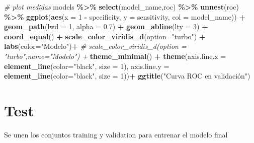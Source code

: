 \documentclass[12pt,a4paper,]{book}
\newenvironment{Shaded}{\begin{snugshade}}{\end{snugshade}}
\newcommand{\AttributeTok}[1]{\textcolor[rgb]{0.13,0.29,0.53}{#1}}
\newcommand{\CommentTok}[1]{\textcolor[rgb]{0.56,0.35,0.01}{\textit{#1}}}
\newcommand{\DecValTok}[1]{\textcolor[rgb]{0.00,0.00,0.81}{#1}}
\newcommand{\FloatTok}[1]{\textcolor[rgb]{0.00,0.00,0.81}{#1}}
\newcommand{\FunctionTok}[1]{\textcolor[rgb]{0.13,0.29,0.53}{\textbf{#1}}}
\newcommand{\NormalTok}[1]{#1}
\newcommand{\SpecialCharTok}[1]{\textcolor[rgb]{0.81,0.36,0.00}{\textbf{#1}}}
\newcommand{\StringTok}[1]{\textcolor[rgb]{0.31,0.60,0.02}{#1}}
\numberwithin{dummy}{section}
\theoremstyle{ocrenumbox}
\theoremstyle{blacknumex}
\theoremstyle{blacknumbox}
\theoremstyle{ocrenum}
\theoremstyle{ocrenum}
\begin{document}
\begin{Shaded}
\begin{Highlighting}[]
\CommentTok{\# plot medidas}
\NormalTok{models }\SpecialCharTok{\%\textgreater{}\%} \FunctionTok{select}\NormalTok{(model\_name,roc) }\SpecialCharTok{\%\textgreater{}\%} \FunctionTok{unnest}\NormalTok{(roc) }\SpecialCharTok{\%\textgreater{}\%} 
  \FunctionTok{ggplot}\NormalTok{(}\FunctionTok{aes}\NormalTok{(}\AttributeTok{x =} \DecValTok{1} \SpecialCharTok{{-}}\NormalTok{ specificity, }\AttributeTok{y =}\NormalTok{ sensitivity, }\AttributeTok{col =}\NormalTok{ model\_name)) }\SpecialCharTok{+} 
  \FunctionTok{geom\_path}\NormalTok{(}\AttributeTok{lwd =} \DecValTok{1}\NormalTok{, }\AttributeTok{alpha =} \FloatTok{0.7}\NormalTok{) }\SpecialCharTok{+}
  \FunctionTok{geom\_abline}\NormalTok{(}\AttributeTok{lty =} \DecValTok{3}\NormalTok{) }\SpecialCharTok{+} 
  \FunctionTok{coord\_equal}\NormalTok{() }\SpecialCharTok{+} 
  \FunctionTok{scale\_color\_viridis\_d}\NormalTok{(}\AttributeTok{option=}\StringTok{"turbo"}\NormalTok{) }\SpecialCharTok{+}
  \FunctionTok{labs}\NormalTok{(}\AttributeTok{color=}\StringTok{"Modelo"}\NormalTok{)}\SpecialCharTok{+}
  \CommentTok{\# scale\_color\_viridis\_d(option = "turbo",name="Modelo") +}
  \FunctionTok{theme\_minimal}\NormalTok{() }\SpecialCharTok{+} 
  \FunctionTok{theme}\NormalTok{(}\AttributeTok{axis.line.x =} \FunctionTok{element\_line}\NormalTok{(}\AttributeTok{color=}\StringTok{"black"}\NormalTok{, }\AttributeTok{size =} \DecValTok{1}\NormalTok{),}
        \AttributeTok{axis.line.y =} \FunctionTok{element\_line}\NormalTok{(}\AttributeTok{color=}\StringTok{"black"}\NormalTok{, }\AttributeTok{size =} \DecValTok{1}\NormalTok{))}\SpecialCharTok{+}
  \FunctionTok{ggtitle}\NormalTok{(}\StringTok{"Curva ROC en validación"}\NormalTok{)}
\end{Highlighting}
\end{Shaded}

\hypertarget{test}{%
\chapter{Test}\label{test}}

Se unen los conjuntos training y validation para entrenar el modelo
final
\end{document}
